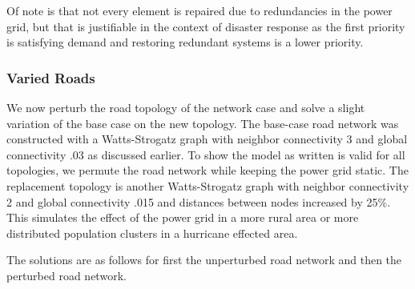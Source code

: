 \documentclass{article}
\begin{document}
	 Of note is that not every element is repaired due to redundancies in the power grid, but that is justifiable in the context of disaster response as the first priority is satisfying demand and restoring redundant systems is a lower priority.  
	
	 \begin{table}[htbp]
		\centering
		\caption{Repair Schedule by interaction method}
		\label{time}
	\end{table}
	\subsubsection{Varied Roads}
	We now perturb the road topology of the network case and solve a slight variation of the base case on the new topology. The base-case road network was constructed with a Watts-Strogatz graph with neighbor connectivity 3 and global connectivity .03 as discussed earlier. To show the model as written is valid for all topologies, we permute the road network while keeping the power grid static. The replacement topology is another Watts-Strogatz graph with neighbor connectivity 2 and global connectivity .015 and distances between nodes increased by 25\%. This simulates the effect of the power grid in a more rural area or more distributed population clusters in a hurricane effected area.
	
	The solutions are as follows for first the unperturbed road network and then the perturbed road network.
	
\end{document}
